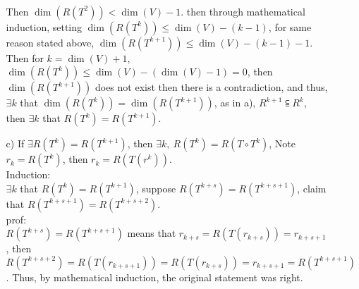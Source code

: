 \documentclass{article}
\begin{document}
\begin{itemize}
\begin{itemize}
        \\Then \(\dim(R(T^2))<\dim(V)-1\). then through mathematical induction, setting \(\dim(R(T^k))\leq\dim(V)-(k-1)\), for same reason stated above, 
        \(\dim(R(T^{k+1}))\leq\dim(V)-(k-1)-1\). Then for \(k = \dim(V)+1\), \(\dim(R(T^{k}))\leq \dim(V)-(\dim(V)-1) = 0\), then \(\dim(R(T^{k+1}))\) does not exist then there is a contradiction, and thus, \(\exists k \) that \(\dim(R(T^k))=\dim(R(T^{k+1}))\), as in a), 
        \(R^{k+1}\subseteqq R^k\), then \(\exists k\) that \(R(T^{k}) = R(T^{k+1})\).
        \item [c)] If \(\exists R(T^{k}) = R(T^{k+1})\), then \(\exists k,\ R(T^k) = R(T\circ T^k)\), Note \(r_k = R(T^k)\), then \(r_k = R(T(r^k))\).
        \\Induction:\\
        \(\exists k\) that \(R(T^k)=R(T^{k+1})\), suppose \(R(T^{k+s}) =R(T^{k+s+1})\), claim that \(R(T^{k+s+1}) =R(T^{k+s+2})\).
        \\prof:\\
        \(R(T^{k+s}) =R(T^{k+s+1})\) means that \(r_{k+s} = R(T(r_{k+s})) = r_{k+s+1}\), then
        \(R(T^{k+s+2}) = R(T(r_{k+s+1})) = R(T(r_{k+s})) = r_{k+s+1} = R(T^{k+s+1})\).
        Thus, by mathematical induction, the original statement was right.
    \end{itemize}
\end{itemize}
\end{document}
